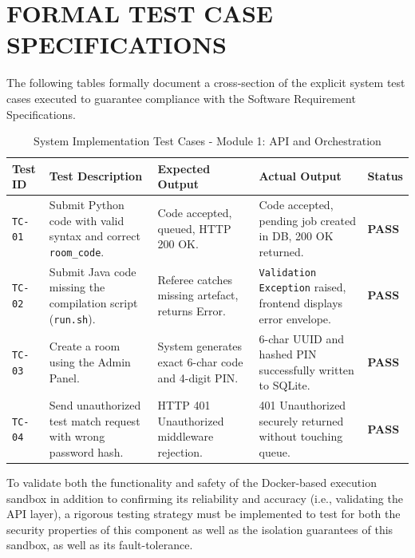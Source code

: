 \documentclass[12pt,a4paper]{report}
\begin{document}
\section{FORMAL TEST CASE SPECIFICATIONS}
The following tables formally document a cross-section of the explicit system test cases executed to guarantee compliance with the Software Requirement Specifications.

\vspace{0.5cm}
\begin{table}[ht]
\centering
\caption{System Implementation Test Cases - Module 1: API and Orchestration}
\label{tab:test_cases_api}
\vspace{0.2cm}
\renewcommand{\arraystretch}{2.0} %
\begin{tabular}{|p{1.5cm}|p{4.2cm}|p{3.8cm}|p{3.8cm}|p{1.4cm}|}
\hline
\textbf{Test ID} & \textbf{Test Description} & \textbf{Expected Output} & \textbf{Actual Output} & \textbf{Status} \\ \hline
\texttt{TC-01} & Submit Python code with valid syntax and correct \texttt{room\_code}. & Code accepted, queued, HTTP 200 OK. & Code accepted, pending job created in DB, 200 OK returned. & \textbf{PASS} \\ \hline
\texttt{TC-02} & Submit Java code missing the compilation script (\texttt{run.sh}). & Referee catches missing artefact, returns Error. & \texttt{Validation Exception} raised, frontend displays error envelope. & \textbf{PASS} \\ \hline
\texttt{TC-03} & Create a room using the Admin Panel. & System generates exact 6-char code and 4-digit PIN. & 6-char UUID and hashed PIN successfully written to SQLite. & \textbf{PASS} \\ \hline
\texttt{TC-04} & Send unauthorized test match request with wrong password hash. & HTTP 401 Unauthorized middleware rejection. & 401 Unauthorized securely returned without touching queue. & \textbf{PASS} \\ \hline
\end{tabular}
\end{table}

\vspace{0.5cm}

To validate both the functionality and safety of the Docker-based execution sandbox in addition to confirming its reliability and accuracy (i.e., validating the API layer), a rigorous testing strategy must be implemented to test for both the security properties of this component as well as the isolation guarantees of this sandbox, as well as its fault-tolerance.
\end{document}
